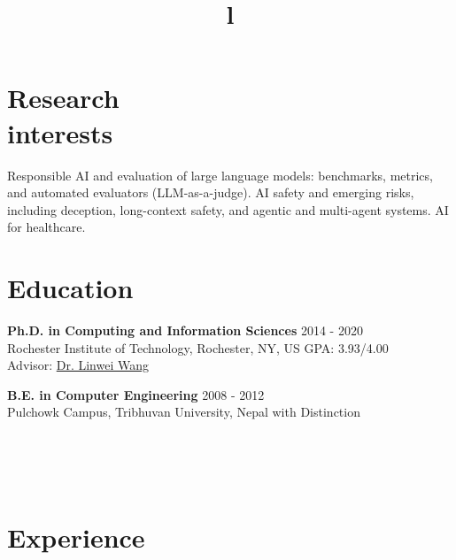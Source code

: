 \documentclass[margin]{res}
\begin{document}
\begin{resume}

\section{Research\\interests}
Responsible AI and evaluation of large language models: benchmarks, metrics, and automated evaluators (LLM-as-a-judge). AI safety and emerging risks, including deception, long-context safety, and agentic and multi-agent systems. AI for healthcare.

\section{Education}

\textbf{Ph.D. in Computing and Information Sciences}
\hfill 2014 - 2020\\
Rochester Institute of Technology, Rochester, NY, US
\hfill GPA: 3.93/4.00\\
Advisor: \href{https://people.rit.edu/lxwast/Linwei_Wangs_HomePage/Home.html}{Dr. Linwei Wang}

\textbf{B.E. in Computer Engineering}
\hfill 2008 - 2012\\
Pulchowk Campus, Tribhuvan University, Nepal
\hfill with Distinction

\begin{format}
\title{l}\\
\\
\body\\
\end{format}

\section{Experience}


\end{resume}
\end{document}
